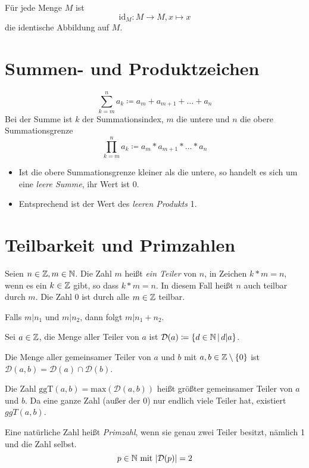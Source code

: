Für jede Menge $M$ ist
\begin{equation*}
  \mathrm{id}_M:M\rightarrow M, x\mapsto x
\end{equation*}
die identische Abbildung auf $M$.

\section{Summen- und Produktzeichen}
\begin{equation*}
  \sum\limits_{k=m}^n a_k\coloneqq a_m + a_{m+1} + \ldots + a_n
\end{equation*}
Bei der Summe ist $k$ der Summationsindex, $m$ die untere und $n$ die obere Summationsgrenze
\begin{equation*}
  \prod\limits_{k=m}^n a_k\coloneqq a_m * a_{m+1} * \ldots * a_n
\end{equation*}

\bemerkung
\begin{itemize}
  \item Ist die obere Summationsgrenze kleiner als die untere, so handelt es sich um eine \emph{leere Summe}, ihr Wert ist 0.
  \item Entsprechend ist der Wert des \emph{leeren Produkts} 1.
\end{itemize}

\section{Teilbarkeit und Primzahlen}
Seien $n\in\mathbb{Z}, m\in\mathbb{N}$. Die Zahl $m$ heißt \emph{ein Teiler} von $n$, in Zeichen $k* m=n$, wenn es ein $k\in\mathbb{Z}$ gibt, so dass $k* m = n$. In diesem Fall heißt $n$ auch teilbar durch $m$.
Die Zahl $0$ ist durch alle $m\in\mathbb{Z}$ teilbar.

Falls $m|n_1$ und $m|n_2$, dann folgt $m|n_1+n_2$.

Sei $a\in\mathbb{Z}$, die Menge aller Teiler von $a$ ist $\mathcal{D}(a)\coloneqq\left\{ d\in\mathbb{N} \,\middle|\, d|a \right\}$.

Die Menge aller gemeinsamer Teiler von $a$ und $b$ mit $a,b\in\mathbb{Z}\setminus\{ 0\}$ ist $\mathcal{D}(a,b) = \mathcal{D}(a) \cap \mathcal{D}(b)$.

Die Zahl $\mathrm{ggT}(a,b) = \mathrm{max}(\mathcal{D}(a,b))$ heißt größter gemeinsamer Teiler von $a$ und $b$. Da eine ganze Zahl (außer der $0$) nur endlich viele Teiler hat, existiert $ggT(a,b)$.


Eine natürliche Zahl heißt \emph{Primzahl}, wenn sie genau zwei Teiler besitzt, nämlich 1 und die Zahl selbst.
\begin{equation*}
  p\in\mathbb{N} \text{ mit } |\mathcal{D}(p)| = 2
\end{equation*}

